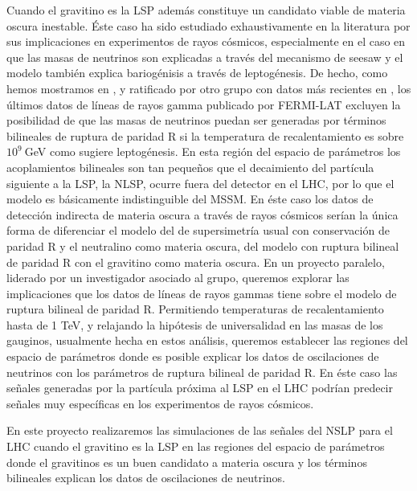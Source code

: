 Cuando el gravitino es la LSP además constituye un candidato viable de
materia oscura inestable. Éste caso ha sido estudiado exhaustivamente
en la literatura por sus implicaciones en experimentos de rayos
cósmicos, especialmente en el caso en que las masas de neutrinos son
explicadas a través del mecanismo de seesaw y el modelo también
explica bariogénisis a través de leptogénesis. De hecho, como hemos
mostramos en \cite{Choi:2010jt}, y ratificado por otro grupo con datos
más recientes en \cite{Garny:2010eg}, los últimos datos de líneas de
rayos gamma publicado por FERMI-LAT excluyen la posibilidad de que las
masas de neutrinos puedan ser generadas por términos bilineales de
ruptura de paridad R si la temperatura de recalentamiento es sobre
$10^9\ $GeV como sugiere leptogénesis. En esta región del espacio de
parámetros los acoplamientos bilineales son tan pequeños que el
decaimiento del partícula siguiente a la LSP, la NLSP, ocurre fuera
del detector en el LHC, por lo que el modelo es básicamente
indistinguible del MSSM. En éste caso los datos de detección indirecta
de materia oscura a través de rayos cósmicos serían la única forma de
diferenciar el modelo del de supersimetría usual con conservación de
paridad R y el neutralino como materia oscura, del modelo con ruptura
bilineal de paridad R con el gravitino como materia oscura.  En un
proyecto paralelo, liderado por un investigador asociado al grupo,
queremos explorar las implicaciones que los datos de líneas de rayos
gammas tiene sobre el modelo de ruptura bilineal de paridad
R. Permitiendo temperaturas de recalentamiento hasta de 1 TeV, y
relajando la hipótesis de universalidad en las masas de los gauginos,
usualmente hecha en estos análisis, queremos establecer las regiones
del espacio de parámetros donde es posible explicar los datos de
oscilaciones de neutrinos con los parámetros de ruptura bilineal de
paridad R. En éste caso las señales generadas por la partícula próxima
al LSP en el LHC podrían predecir señales muy específicas en los
experimentos de rayos cósmicos.
\begin{proyecto}
  En este proyecto realizaremos las simulaciones de las señales del
  NSLP para el LHC cuando el gravitino es la LSP en las regiones del
  espacio de parámetros donde el gravitinos es un buen candidato a
  materia oscura y los términos bilineales explican los datos de
  oscilaciones de neutrinos. 
\end{proyecto}



